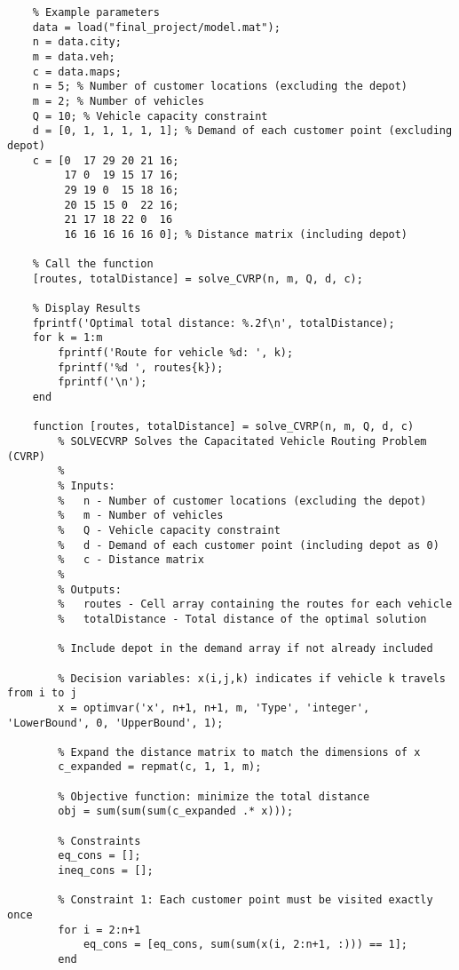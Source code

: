     \begin{lstlisting}
    % Example parameters
    data = load("final_project/model.mat");
    n = data.city;
    m = data.veh;
    c = data.maps;
    n = 5; % Number of customer locations (excluding the depot)
    m = 2; % Number of vehicles
    Q = 10; % Vehicle capacity constraint
    d = [0, 1, 1, 1, 1, 1]; % Demand of each customer point (excluding depot)
    c = [0  17 29 20 21 16;
         17 0  19 15 17 16;
         29 19 0  15 18 16;
         20 15 15 0  22 16;
         21 17 18 22 0  16
         16 16 16 16 16 0]; % Distance matrix (including depot)
        
    % Call the function
    [routes, totalDistance] = solve_CVRP(n, m, Q, d, c);
        
    % Display Results
    fprintf('Optimal total distance: %.2f\n', totalDistance);
    for k = 1:m
        fprintf('Route for vehicle %d: ', k);
        fprintf('%d ', routes{k});
        fprintf('\n');
    end
        
    function [routes, totalDistance] = solve_CVRP(n, m, Q, d, c)
        % SOLVECVRP Solves the Capacitated Vehicle Routing Problem (CVRP)
        %
        % Inputs:
        %   n - Number of customer locations (excluding the depot)
        %   m - Number of vehicles
        %   Q - Vehicle capacity constraint
        %   d - Demand of each customer point (including depot as 0)
        %   c - Distance matrix
        %
        % Outputs:
        %   routes - Cell array containing the routes for each vehicle
        %   totalDistance - Total distance of the optimal solution
            
        % Include depot in the demand array if not already included
        
        % Decision variables: x(i,j,k) indicates if vehicle k travels from i to j
        x = optimvar('x', n+1, n+1, m, 'Type', 'integer', 'LowerBound', 0, 'UpperBound', 1);
        
        % Expand the distance matrix to match the dimensions of x
        c_expanded = repmat(c, 1, 1, m);
            
        % Objective function: minimize the total distance
        obj = sum(sum(sum(c_expanded .* x)));
            
        % Constraints
        eq_cons = [];
        ineq_cons = [];
            
        % Constraint 1: Each customer point must be visited exactly once
        for i = 2:n+1
            eq_cons = [eq_cons, sum(sum(x(i, 2:n+1, :))) == 1];
        end
            

\end{lstlisting}
